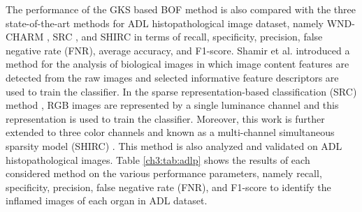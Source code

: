 The performance of the GKS based BOF method is also compared with the three state-of-the-art methods for ADL histopathological image dataset, namely WND-CHARM \cite{shamir2008}, SRC \cite{wright2009}, and SHIRC \cite{srinivas2014} in terms of recall, specificity, precision, false negative rate (FNR), average accuracy, and F1-score. Shamir et al. \cite{shamir2008} introduced a method for the analysis of biological images in which image content features are detected from the raw images and selected informative feature descriptors are used to train the classifier. In the sparse representation-based classification (SRC) method \cite{wright2009}, RGB images are represented by a single luminance channel and this representation is used to train the classifier. Moreover, this work is further extended to three color channels and known as a multi-channel simultaneous sparsity model (SHIRC) \cite{srinivas2014}. This method is also analyzed and validated on ADL histopathological images. Table \ref{ch3:tab:adlp} shows the results of each considered method on the various performance parameters, namely recall, specificity, precision, false negative rate (FNR), and F1-score to identify the inflamed images of each organ in ADL dataset.
